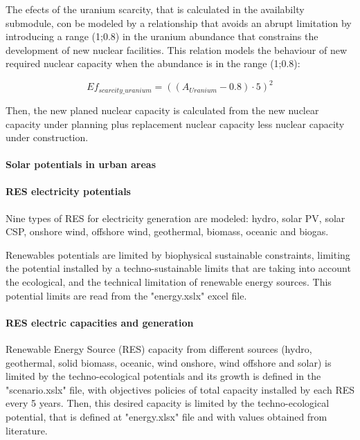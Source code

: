 The efects of the uranium scarcity, that is calculated in the availabilty submodule, con be modeled by a relationship that avoids an abrupt limitation by introducing a range (1;0.8) in the uranium abundance that constrains the development of new nuclear facilities. This relation models the behaviour of new required nuclear capacity when the abundance is in the range (1;0.8):

\begin{equation}
Ef_{scarcity\_uranium}=  ((A_{Uranium}-0.8) \cdot 5)^2
\label{eq:effects-uranium-scarcity}
\end{equation}

Then, the new planed nuclear capacity is calculated from the new nuclear capacity under planning plus replacement nuclear capacity less nuclear capacity under construction.

\paragraph{Solar potentials in urban areas}


\paragraph{RES electricity potentials}

Nine types of RES for electricity generation are modeled: hydro, solar PV, solar CSP, onshore wind, offshore wind, geothermal, biomass, oceanic and biogas.

Renewables potentials are limited by biophysical sustainable constraints, limiting the potential installed by a techno-sustainable limits that are taking into account the ecological, and the technical limitation of renewable energy sources. This potential limits are read from the "energy.xslx" excel file.

\paragraph{RES electric capacities and generation}

Renewable Energy Source (RES) capacity from different sources (hydro, geothermal, solid biomass, oceanic, wind onshore, wind offshore and solar) is limited by the techno-ecological potentials and its growth is defined in the "scenario.xslx" file, with objectives policies of total capacity installed by each RES every 5 years.  
Then, this desired capacity is limited by the techno-ecological potential, that is defined at "energy.xlsx" file and with values obtained from literature. 

